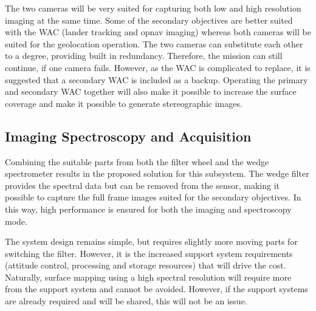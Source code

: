 The two cameras will be very suited for capturing both low and high resolution imaging at the same time. Some of the secondary objectives are better suited with the WAC (lander tracking and opnav imaging) whereas both cameras will be suited for the geolocation operation. The two cameras can substitute each other to a degree, providing built in redundancy. Therefore, the mission can still continue, if one camera fails. However, as the WAC is complicated to replace, it is suggested that a secondary WAC is included as a backup. Operating the primary and secondary WAC together will also make it possible to increase the surface coverage and make it possible to generate stereographic images. 
\subsection{Imaging Spectroscopy and Acquisition}
Combining the suitable parts from both the filter wheel and the wedge spectrometer results in the proposed solution for this subsystem. The wedge filter provides the spectral data but can be removed from the sensor, making it possible to capture the full frame images suited for the secondary objectives. In this way, high performance is ensured for both the imaging and spectroscopy mode. 

The system design remains simple, but requires slightly more moving parts for switching the filter. However, it is the increased support system requirements (attitude control, processing and storage resources) that will drive the cost. Naturally, surface mapping using a high spectral resolution will require more from the support system and cannot be avoided. However, if the support systems are already required and will be shared, this will not be an issue.

